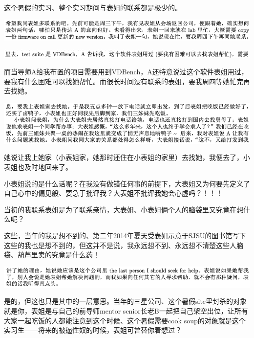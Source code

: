 \documentclass[9pt, b5paper]{article}
\begin{document}
这个暑假的实习、整个实习期间与表姐的联系都是极少的。 

\begin{center}
\includegraphics[width=.9\linewidth]{./pic/backups_plans_20210514_102353.png}
\end{center}

\begin{center}
\includegraphics[width=.9\linewidth]{./pic/backups_plans_20210514_102251.png}
\end{center}

而当导师A给我布置的项目需要用到VDBench，A还特意说过这个软件表姐用过，要我有什么困难可以找她帮忙。而很长时间没有联系的表姐，要我周四等她忙完再去找她。 

\begin{center}
\includegraphics[width=.9\linewidth]{./pic/backups_plans_20210514_102819.png}
\end{center}

她说让我上她家（小表姐家，她那时还住在小表姐的家里）去找她，我便去了，小表姐也及时地回来了。 

小表姐说的是什么话呢？在我没有做错任何事的前提下，大表姐又为何要先定义了自己心中的偏见般、要急于批评我？大表姐不批评我她会心虚吗？！！！

当初的我联系表姐是为了联系亲情，大表姐、小表姐俩个人的脑袋里又究竟在想什么呢？

这些，当年的我是想不到的、第二年2014年夏天受表姐示意于SJSU的图书馆写下这些的我也是想不到的，但这并不是说，我永远想不到、永远想不清楚这些人脑袋、葫芦里卖的究竟是什么药！


\begin{center}
\includegraphics[width=.9\linewidth]{./pic/backups_plans_20210514_103248.png}
\end{center}

是的，但这也只是其中的一层意思。当年的三星公司、这个暑假site里封杀的对象就是你，表姐是与自己的前导师mentor senior长老B一起把自己架空出位，让所有大家一起吃饭的人都能注意到这个时候、这个暑假需要cook soup的对象就是这个实习生——将来的被逼性奴的时候，表姐可曾替你着想过？
\end{document}
